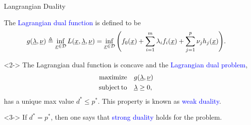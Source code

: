 \documentclass[10pt,english,aspectratio=169]{beamer}
\begin{document}
\begin{frame}{Langrangian Duality}

\begin{definition}
The \textcolor{blue}{Lagrangian dual function} is defined to be \vspace{-1.5mm}
\[ g(\underline{\lambda},\underline{\nu}) \triangleq \inf_{\underline{x}\in \mathcal{D}} L(\underline{x},\underline{\lambda},\underline{\nu}) = \inf_{\underline{x}\in \mathcal{D}} \Bigg( f_0(\underline{x}) + \sum_{i=1}^m \lambda_i f_i(\underline{x}) + \sum_{j=1}^p \nu_j h_j(\underline{x}) \Bigg). \]
\end{definition}



\begin{lemma}<2->
The Lagrangian dual function is concave and the \textcolor{blue}{Lagrangian dual problem}, \vspace{-2.5mm}
\begin{align*}
\mathrm{maximize} \quad & g(\vecnot{\lambda},\vecnot{\nu}) \\
\mathrm{subject\,to} \quad & \vecnot{\lambda} \geq 0, \vspace{-1mm}
\end{align*}
has a unique max value $d^* \leq p^*$.
This property is known as \textcolor{blue}{weak duality}.
\end{lemma}

\begin{definition}<3->
If $d^* = p^*$, then one says that \textcolor{blue}{strong duality} holds for the problem.
\end{definition}


\end{frame}
\end{document}
